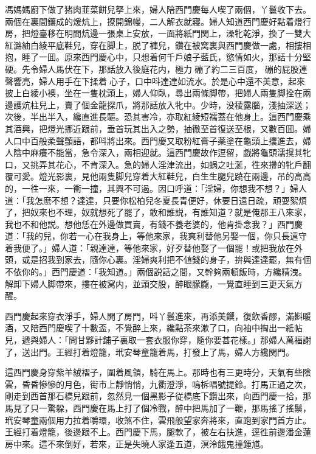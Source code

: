 馮媽媽廚下做了猪肉韮菜餅兒拏上來，婦人陪西門慶每人喫了兩個，丫鬟收下去。兩個在裏間鑲成的煖炕上，撩開錦幔，二人解衣就寢。婦人知道西門慶好點着燈行房，把燈臺移在明間炕邊一張桌上安放，一面將紙門関上，澡牝乾淨，換了一雙大紅潞紬白綾平底鞋兒，穿在脚上，脱了褲兒，鑽在被窝裏與西門慶做一處，相摟相抱，睡了一囬。原來西門慶心中，只想着何千戶娘子藍氏，慾情如火，那話十分堅硬。先令婦人馬伏在下，那話放入後庭花内，極力𢵞磞了約二三百度，𢵞磞的屁股連聲響亮，婦人用手在下揉着𣭈心子，口中呌達達如流水。於是心中還不美意，起來披上白綾小襖，坐在一隻枕頭上，婦人仰臥，尋出兩條脚帶，把婦人兩隻脚拴在兩邊護炕柱兒上，賣了個金龍探爪，將那話放入牝中。少時，没稜露腦，淺抽深送；次後，半出半入，纔直進長驅。恐其害冷，亦取紅綾短襦蓋在他身上。這西門慶乘其酒興，把燈光挪近跟前，垂首玩其出入之勢，抽徹至首復送至根，又數百囬。婦人口中百般柔聲顫語，都呌將出來。西門慶又取粉紅膏子薬塗在龜頭上攮進去，婦人陰中麻癢不能當，急令深入，兩相迎就。這西門慶故作逗留，戯將龜頭濡㨪其牝口，又挑弄其花心，不肯深入。急的婦人淫津流出，如蜗之吐涎，徃來摕的牝戶翻覆可愛。燈光影裏，見他兩隻脚兒穿着大紅鞋兒，白生生腿兒蹺在兩邊，吊的高高的，一徃一來，一衝一撞，其興不可遏。因口呼道：「淫婦，你想我不想？」婦人道：「我怎麽不想？達達，只要你松柏兒冬夏長青便好，休要日遠日疏，頑耍絮煩了，把奴來也不理，奴就想死了罷了，敢和誰説，有誰知道？就是俺那王八來家，我也不和他説。想他恁在外邊做買賣，有錢不養老婆的，他肯掛念我？」西門慶道：「我的兒，你若一心在我身上，等他來家，我爽利替他另娶一個，你只長遠守着我便了。」婦人道：「親達達，等他來家，好歹替他娶了一個罷！或把我放在外頭，或是招我到家去，隨你心裏。淫婦爽利把不値錢的身子，拚與達達罷，無有個不依你的。」西門慶道：「我知道。」兩個説話之間，又幹夠兩頓飯時，方纔精洩。解卸下婦人脚帶來，摟在被窝内，並頭交股，醉眼朦朧，一覺直睡到三更天氣方醒。

西門慶起來穿衣淨手，婦人開了房門，呌丫鬟進來，再添美饌，復飲香醪，滿斟暖酒，又陪西門慶喫了十數盃，不覺醉上來，纔點茶來漱了口，向袖中掏出一紙帖兒，遞與婦人：「問甘夥計鋪子裏取一套衣服你穿，隨你要甚花樣。」那婦人萬福謝了，送出門。王經打着燈籠，玳安琴童籠着馬，打發上了馬，婦人方纔関門。

這西門慶身穿紫羊絨褶子，圍着風領，騎在馬上。那時也有三更時分，天氣有些陰雲，昏昏慘慘的月色，街巿上靜悄悄，九衢澄淨，嗚柝唱號提鈴。打馬正過之次，剛走到西首那石橋兒跟前，忽然見一個黑影子従橋底下鑽出來，向西門慶一拾，那馬見了只一驚躱，西門慶在馬上打了個冷戰，醉中把馬加了一鞭，那馬搖了搖鬃，玳安琴童兩個用力拉着嚼環，收煞不住，雲飛般望家奔將來，直跑到家門首方止。王經打着燈籠，後邊跟不上。西門慶下馬，腿軟了，被左右扶進，逕徃前邊潘金蓮房中來。這不來倒好，若來，正是失曉人家逢五道，溟泠餓鬼撞鍾馗。

